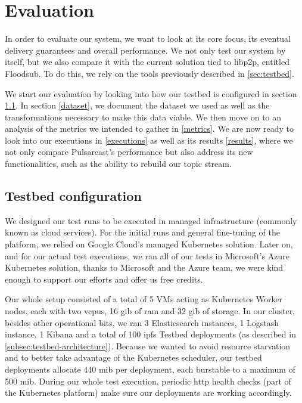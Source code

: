 
\chapter{Evaluation}
\label{chapter:evaluation}


In order to evaluate our system, we want to look at its core focus, its
eventual delivery guarantees and overall performance. We not only test our
system by itself, but we also compare it with the current solution tied to
libp2p, entitled Floodsub. To do this, we rely on the tools previously
described in \ref{sec:testbed}.

We start our evaluation by looking into how our testbed is configured in
section \ref{testbed-configuration}. In section \ref{dataset}, we document the
dataset we used as well as the transformations necessary to make this data
viable. We then move on to an analysis of the metrics we intended to gather in
\ref{metrics}. We are now ready to look into our executions in \ref{executions}
as well as its results \ref{results}, where we not only compare Pulsarcast's
performance but also address its new functionalities, such as the ability to
rebuild our topic stream.

\section{Testbed configuration}\label{testbed-configuration}

We designed our test runs to be executed in managed infrastructure (commonly
known as cloud services). For the initial runs and general fine-tuning of the
platform, we relied on Google Cloud's managed Kubernetes solution. Later on,
and for our actual test executions, we ran all of our tests in Microsoft's
Azure Kubernetes solution, thanks to Microsoft and the Azure team, we were kind
enough to support our efforts and offer us free credits.

Our whole setup consisted of a total of 5 VMs acting as Kubernetes Worker
nodes, each with two \acrshort{vcpu}s, 16 \acrshort{gib} of \acrshort{ram} and 32 \acrshort{gib} of storage. In our
cluster, besides other operational bits, we ran 3 Elasticsearch instances, 1
Logstash instance, 1 Kibana and a total of 100 \acrshort{ipfs} Testbed
deployments (as described in \ref{subsec:testbed-architecture}). Because we
wanted to avoid resource starvation and to better take advantage of the
Kubernetes scheduler, our testbed deployments allocate 440 \acrshort{mib} per deployment,
each burstable to a maximum of 500 \acrshort{mib}. During our whole test execution,
periodic \acrshort{http} health checks (part of the Kubernetes platform) make
sure our deployments are working accordingly.

